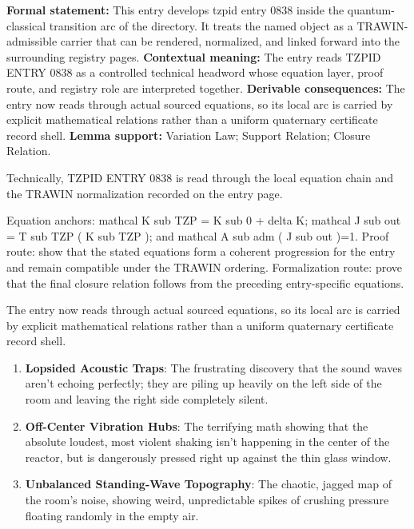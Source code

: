 \begingroup\footnotesize\setlength{\emergencystretch}{3em}\sloppy
\textbf{Formal statement:} This entry develops tzpid entry 0838 inside the quantum-classical transition arc of the directory. It treats the named object as a TRAWIN-admissible carrier that can be rendered, normalized, and linked forward into the surrounding registry pages. \textbf{Contextual meaning:} The entry reads TZPID ENTRY 0838 as a controlled technical headword whose equation layer, proof route, and registry role are interpreted together. \textbf{Derivable consequences:} The entry now reads through actual sourced equations, so its local arc is carried by explicit mathematical relations rather than a uniform quaternary certificate record shell. \textbf{Lemma support:} Variation Law; Support Relation; Closure Relation.\par
\endgroup

Technically, TZPID ENTRY 0838 is read through the local equation chain and the TRAWIN normalization recorded on the entry page.

Equation anchors: mathcal K sub TZP = K sub 0 + delta K; mathcal J sub out = T sub TZP ( K sub TZP ); and mathcal A sub adm ( J sub out )=1. Proof route: show that the stated equations form a coherent progression for the entry and remain compatible under the TRAWIN ordering. Formalization route: prove that the final closure relation follows from the preceding entry-specific equations.

The entry now reads through actual sourced equations, so its local arc is carried by explicit mathematical relations rather than a uniform quaternary certificate record shell.
\endgroup

\begin{enumerate}[leftmargin=1.6em,itemsep=6pt,topsep=4pt]
\item \textbf{Lopsided Acoustic Traps}: The frustrating discovery that the sound waves aren't echoing perfectly; they are piling up heavily on the left side of the room and leaving the right side completely silent.
\item \textbf{Off-Center Vibration Hubs}: The terrifying math showing that the absolute loudest, most violent shaking isn't happening in the center of the reactor, but is dangerously pressed right up against the thin glass window.
\item \textbf{Unbalanced Standing-Wave Topography}: The chaotic, jagged map of the room's noise, showing weird, unpredictable spikes of crushing pressure floating randomly in the empty air.
\end{enumerate}

